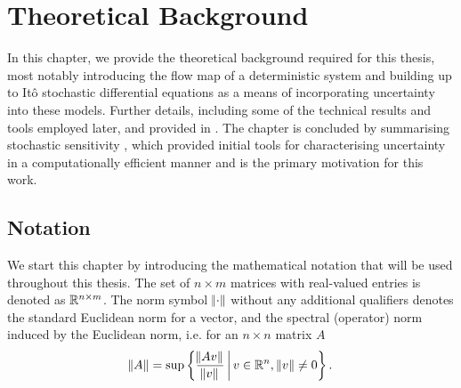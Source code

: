 
\chapter{Theoretical Background}\label{ch:background}
In this chapter, we provide the theoretical background required for this thesis, most notably introducing the flow map of a deterministic system and building up to It\^o stochastic differential equations as a means of incorporating uncertainty into these models.
Further details, including some of the technical results and tools employed later, and provided in .
The chapter is concluded by summarising stochastic sensitivity \citep{Balasuriya_2020_StochasticSensitivityComputable}, which provided initial tools for characterising uncertainty in a computationally efficient manner and is the primary motivation for this work.





\section{Notation}
We start this chapter by introducing the mathematical notation that will be used throughout this thesis.
The set of \(n \times m\) matrices with real-valued entries is denoted as \(\mathbb{R}^{n\times m}\).
The norm symbol \(\norm{\cdot}\) without any additional qualifiers denotes the standard Euclidean norm for a vector, and the spectral (operator) norm induced by the Euclidean norm, i.e. for an \(n \times n\) matrix \(A\)
\[
	\norm{A} = \sup\left\{\frac{\norm{Av}}{\norm{v}}\,\middle|\,v \in \mathbb{R}^n, \, \norm{v} \neq 0\right\}.
\]

